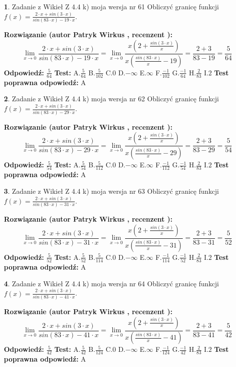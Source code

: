 \documentclass[12pt, a4paper]{article}
\theoremstyle{definition} %
\newtheorem{zad}{}
\newcommand{\zadStart}[1]{\begin{zad}#1\newline}
\newcommand{\zadStop}{\end{zad}}
\newcommand{\rozwStart}[2]{\noindent \textbf{Rozwiązanie (autor #1 , recenzent #2): }\newline}
\newcommand{\rozwStop}{\newline}
\newcommand{\odpStart}{\noindent \textbf{Odpowiedź:}\newline}
\newcommand{\odpStop}{\newline}
\newcommand{\testStart}{\noindent \textbf{Test:}\newline}
\newcommand{\testStop}{\newline}
\newcommand{\kluczStart}{\noindent \textbf{Test poprawna odpowiedź:}\newline}
\newcommand{\kluczStop}{\newline}
\begin{document}
\zadStart{Zadanie z Wikieł Z 4.4 k) moja wersja nr 61}
Obliczyć granicę funkcji $f(x)=\frac{2\cdot x +sin(3\cdot x)}{sin(83\cdot x) -19\cdot x}$.
\zadStop
\rozwStart{Patryk Wirkus}{}
$$\lim\limits_{x\to 0}\frac{2\cdot x +sin(3\cdot x)}{sin(83\cdot x) -19\cdot x}
=\lim\limits_{x\to 0}\frac{x(2+\frac{sin(3\cdot x)}{x})}{x(\frac{sin(83\cdot x)}{x}-19)}
=\frac{2+3}{83-19} = \frac{5}{64}$$
\rozwStop
\odpStart
$\frac{5}{64}$
\odpStop
\testStart
A.$\frac{5}{64}$
B.$\frac{5}{102}$
C.$0$
D.$-\infty$
E.$\infty$
F.$\frac{-1}{102}$
G.$\frac{-1}{64}$
H.$\frac{2}{83}$
I.$2$
\testStop
\kluczStart
A
\kluczStop



\zadStart{Zadanie z Wikieł Z 4.4 k) moja wersja nr 62}
Obliczyć granicę funkcji $f(x)=\frac{2\cdot x +sin(3\cdot x)}{sin(83\cdot x) -29\cdot x}$.
\zadStop
\rozwStart{Patryk Wirkus}{}
$$\lim\limits_{x\to 0}\frac{2\cdot x +sin(3\cdot x)}{sin(83\cdot x) -29\cdot x}
=\lim\limits_{x\to 0}\frac{x(2+\frac{sin(3\cdot x)}{x})}{x(\frac{sin(83\cdot x)}{x}-29)}
=\frac{2+3}{83-29} = \frac{5}{54}$$
\rozwStop
\odpStart
$\frac{5}{54}$
\odpStop
\testStart
A.$\frac{5}{54}$
B.$\frac{5}{112}$
C.$0$
D.$-\infty$
E.$\infty$
F.$\frac{-1}{112}$
G.$\frac{-1}{54}$
H.$\frac{2}{83}$
I.$2$
\testStop
\kluczStart
A
\kluczStop



\zadStart{Zadanie z Wikieł Z 4.4 k) moja wersja nr 63}
Obliczyć granicę funkcji $f(x)=\frac{2\cdot x +sin(3\cdot x)}{sin(83\cdot x) -31\cdot x}$.
\zadStop
\rozwStart{Patryk Wirkus}{}
$$\lim\limits_{x\to 0}\frac{2\cdot x +sin(3\cdot x)}{sin(83\cdot x) -31\cdot x}
=\lim\limits_{x\to 0}\frac{x(2+\frac{sin(3\cdot x)}{x})}{x(\frac{sin(83\cdot x)}{x}-31)}
=\frac{2+3}{83-31} = \frac{5}{52}$$
\rozwStop
\odpStart
$\frac{5}{52}$
\odpStop
\testStart
A.$\frac{5}{52}$
B.$\frac{5}{114}$
C.$0$
D.$-\infty$
E.$\infty$
F.$\frac{-1}{114}$
G.$\frac{-1}{52}$
H.$\frac{2}{83}$
I.$2$
\testStop
\kluczStart
A
\kluczStop



\zadStart{Zadanie z Wikieł Z 4.4 k) moja wersja nr 64}
Obliczyć granicę funkcji $f(x)=\frac{2\cdot x +sin(3\cdot x)}{sin(83\cdot x) -41\cdot x}$.
\zadStop
\rozwStart{Patryk Wirkus}{}
$$\lim\limits_{x\to 0}\frac{2\cdot x +sin(3\cdot x)}{sin(83\cdot x) -41\cdot x}
=\lim\limits_{x\to 0}\frac{x(2+\frac{sin(3\cdot x)}{x})}{x(\frac{sin(83\cdot x)}{x}-41)}
=\frac{2+3}{83-41} = \frac{5}{42}$$
\rozwStop
\odpStart
$\frac{5}{42}$
\odpStop
\testStart
A.$\frac{5}{42}$
B.$\frac{5}{124}$
C.$0$
D.$-\infty$
E.$\infty$
F.$\frac{-1}{124}$
G.$\frac{-1}{42}$
H.$\frac{2}{83}$
I.$2$
\testStop
\kluczStart
A
\kluczStop
\end{document}
